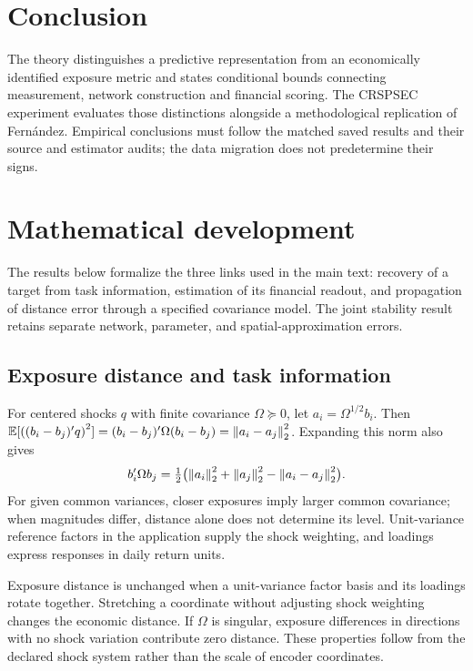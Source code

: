 \documentclass[11pt]{article}
\renewcommand{\lean}[1]{\ignorespaces}
\renewcommand{\leanok}{\ignorespaces}
\begin{document}
\section{Conclusion}
The theory distinguishes a predictive representation from an economically
identified exposure metric and states conditional bounds connecting measurement,
network construction and financial scoring. The CRSP\textendash{}SEC
experiment evaluates
those distinctions alongside a methodological replication of Fern\'andez.
Empirical conclusions must follow the matched saved results and their source
and estimator audits; the data migration does not predetermine their signs.

\appendix
\section{Mathematical development}\label{sec:theory}
The results below formalize the three links used in the main text: recovery
of a target from task information, estimation of its financial readout, and
propagation of distance error through a specified covariance model.
The joint stability result retains separate network, parameter, and
spatial-approximation errors.
\subsection{Exposure distance and task information}
For centered shocks $q$ with finite covariance $\Omega\succeq0$, let
$a_i=\Omega^{1/2}b_i$. Then
$\mathbb{E}[{((b_i-b_j)'q)}^2]=(b_i-b_j)'\Omega(b_i-b_j)=\left\lVert a_i-a_j\right\rVert_2^2$.
Expanding this norm also gives
\begin{equation}\label{eq:exposure-covariance}
  b_i'\Omega b_j
  =\tfrac12\bigl(\left\lVert a_i\right\rVert_2^2+\left\lVert a_j\right\rVert_2^2-\left\lVert a_i-a_j\right\rVert_2^2\bigr).
\end{equation}
\lean{FreeFoundations.Exposure.covariance_eq,
FreeFoundations.Score.response_sq}\leanok{}
For given common variances, closer exposures imply larger common covariance;
when magnitudes differ, distance alone does not determine its level.
Unit-variance reference factors in the application supply the shock weighting,
and loadings express responses in daily return units.

Exposure distance is unchanged when a unit-variance factor basis and its
loadings rotate together. Stretching a coordinate without adjusting shock
weighting changes the economic distance. If $\Omega$ is singular, exposure
differences in directions with no shock variation contribute zero distance.
These properties follow from the declared shock system rather than the scale
of encoder coordinates.
\end{document}
